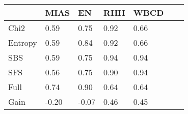 \begin{tabular}{|l|l|l|l|l|l|l|}
\toprule
{} &  MIAS &    EN &  RHH & WBCD \\
\midrule
Chi2    &  0.59 &  0.75 & 0.92 & 0.66 \\
Entropy &  0.59 &  0.84 & 0.92 & 0.66 \\
SBS     &  0.59 &  0.75 & 0.94 & 0.94 \\
SFS     &  0.56 &  0.75 & 0.90 & 0.94 \\
Full    &  0.74 &  0.90 & 0.64 & 0.64 \\
Gain    & -0.20 & -0.07 & 0.46 & 0.45 \\
\bottomrule
\end{tabular}
